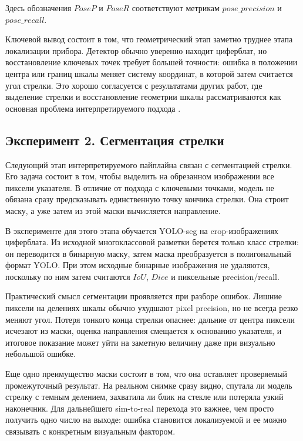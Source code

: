 \documentclass[a4paper,14pt]{extarticle}
\begin{document}
Здесь обозначения $Pose P$ и $Pose R$ соответствуют метрикам $pose\_precision$ и $pose\_recall$.

	Ключевой вывод состоит в том, что геометрический этап заметно труднее этапа локализации прибора. Детектор обычно уверенно находит циферблат, но восстановление ключевых точек требует большей точности: ошибка в положении центра или границ шкалы меняет систему координат, в которой затем считается угол стрелки. Это хорошо согласуется с результатами других работ, где выделение стрелки и восстановление геометрии шкалы рассматриваются как основная проблема интерпретируемого подхода \cite{dyer1983,adsul2021,sciRep2025,linknetYolo2024}.

	\subsection{Эксперимент 2. Сегментация стрелки}

	Следующий этап интерпретируемого пайплайна связан с сегментацией стрелки. Его задача состоит в том, чтобы выделить на обрезанном изображении все пиксели указателя. В отличие от подхода с ключевыми точками, модель не обязана сразу предсказывать единственную точку кончика стрелки. Она строит маску, а уже затем из этой маски вычисляется направление.

		В эксперименте для этого этапа обучается YOLO-seg на crop-изображениях циферблата. Из исходной многоклассовой разметки берется только класс стрелки: он переводится в бинарную маску, затем маска преобразуется в полигональный формат YOLO. При этом исходные бинарные изображения не удаляются, поскольку по ним затем считаются $IoU$, $Dice$ и пиксельные precision/recall.

		Практический смысл сегментации проявляется при разборе ошибок. Лишние пиксели на делениях шкалы обычно ухудшают pixel precision, но не всегда резко меняют угол. Потеря тонкого конца стрелки опаснее: дальние от центра пиксели исчезают из маски, оценка направления смещается к основанию указателя, и итоговое показание может уйти на заметную величину даже при визуально небольшой ошибке.

		Еще одно преимущество маски состоит в том, что она оставляет проверяемый промежуточный результат. На реальном снимке сразу видно, спутала ли модель стрелку с темным делением, захватила ли блик на стекле или потеряла узкий наконечник. Для дальнейшего sim-to-real перехода это важнее, чем просто получить одно число на выходе: ошибка становится локализуемой и ее можно связывать с конкретным визуальным фактором.
\end{document}
